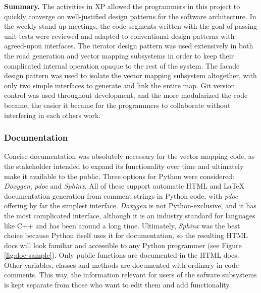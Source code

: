 \documentclass[12pt,twoside]{article}
\begin{document}
\textbf{Summary.}
The activities in XP allowed the programmers in this project to quickly converge on well-justified design patterns for the software architecture. In the weekly stand-up meetings, the code segments written with the goal of passing unit tests were reviewed and adapted to conventional design patterns with agreed-upon interfaces. The iterator design pattern was used extensively in both the road generation and vector mapping subsystems in order to keep their complicated internal operation opaque to the rest of the system. The facade design pattern was used to isolate the vector mapping subsystem altogether, with only two simple interfaces to generate and link the entire map. Git version control was used throughout development, and the more modularized the code became, the easier it became for the programmers to collaborate without interfering in each others work.

\subsubsection{Documentation}
Concise documentation was absolutely necessary for the vector mapping code, as the stakeholder intended to expand its functionality over time and ultimately make it available to the public. Three options for Python were considered: \textit{Doxygen}, \textit{pdoc} and \textit{Sphinx}. All of these support automatic HTML and LaTeX documentation generation from comment strings in Python code, with \textit{pdoc} offering by far the simplest interface. \textit{Doxygen} is not Python-exclusive, and it has the most complicated interface, although it is an industry standard for languages like C++ and has been around a long time. Ultimately, \textit{Sphinx} was the best choice because Python itself uses it for documentation, so the resulting HTML docs will look familiar and accessible to any Python programmer (see Figure \ref{fig:doc-sample}). Only public functions are documented in the HTML docs. Other variables, classes and methods are documented with ordinary in-code comments. This way, the information relevant for users of the sofware subsystems is kept separate from those who want to edit them and add functionality.
\end{document}
